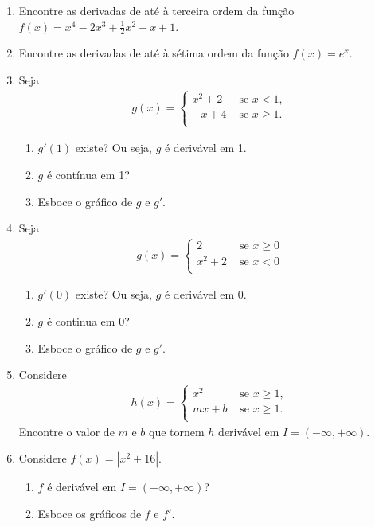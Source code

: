 \begin{enumerate}
    \item Encontre as derivadas de até à terceira ordem da função $f(x)=x^4-2x^3+ \frac{1}{2}x^2 + x +1$.
    \item Encontre as derivadas de até à sétima ordem da função $f(x)=e^x$.
    \item Seja 
    \begin{align}
        g(x)=\begin{cases}
                x^2+ 2 & \text{ se } x<1,\\
                -x + 4 &\text{ se } x \geq 1.\\
            \end{cases}
    \end{align}
        \begin{enumerate}
            \item $g'(1)$ existe? Ou seja, $g$ é derivável em 1.
            \item $g$ é contínua em 1?
            \item Esboce o gráfico de $g$ e $g'$.
        \end{enumerate}
\item Seja        
    \begin{align}
        g(x)=\begin{cases}
                2 &\text{ se } x\geq 0\\
                x^2 + 2 &\text{ se } x < 0\\
            \end{cases}
    \end{align}
        \begin{enumerate}
            \item $g'(0)$ existe? Ou seja, $g$ é derivável em 0.
            \item $g$ é continua em 0? 
            \item Esboce o gráfico de $g$ e $g'$.
        \end{enumerate}
    \item Considere 
         \begin{align}
        h(x)=\begin{cases}
                x^2 &\text{ se } x\geq 1,\\
                mx+b &\text{ se } x \geq 1.\\
            \end{cases}
    \end{align}
    Encontre o valor de $m$ e $b$ que tornem  $h$ derivável em $I=(-\infty, +\infty)$.
    \item Considere $f(x)=|x^2+16|$.
        \begin{enumerate}
            \item $f$ é derivável em $I=(-\infty, +\infty)$?
            \item Esboce os gráficos de $f$ e $f'$.
        \end{enumerate}


\end{enumerate}
